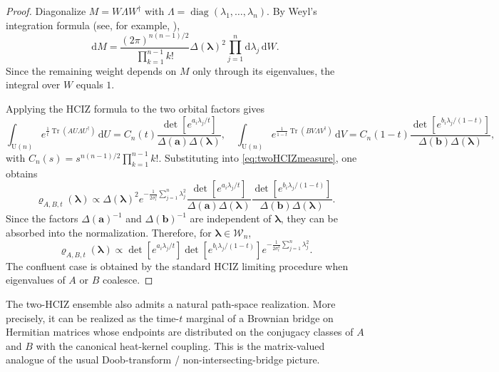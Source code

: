 \documentclass[11pt,a4paper]{article}
\theoremstyle{definition}\newtheorem{definition}[theorem]{Definition}
\theoremstyle{remark}\newtheorem{remark}[theorem]{Remark}
\numberwithin{equation}{section}
\DeclareMathOperator{\Tr}{Tr}
\DeclareMathOperator{\diag}{diag}
\newcommand{\dd}{\mathrm{d}}
\newcommand{\UU}{\mathrm{U}(n)}
\begin{document}
\begin{proof}
Diagonalize $M=W\Lambda W^\dagger$ with $\Lambda=\diag(\lambda_1,\dots,\lambda_n)$.  
By Weyl's integration formula (see, for example, \cite{Mehta2004}),
\begin{equation}
\dd M = \frac{(2\pi)^{n(n-1)/2}}{\prod_{k=1}^{n-1} k!} \Delta(\bm\lambda)^2 \prod_{j=1}^n \dd \lambda_j\,\dd W .
\end{equation}
Since the remaining weight depends on $M$ only through its eigenvalues, the integral over $W$ equals $1$.

Applying the HCIZ formula to the two orbital factors gives
\begin{equation*}
\int_{\UU} e^{\frac1t \Tr(AU\Lambda U^\dagger)}\,\dd U
= C_n(t)  \frac{\det[e^{a_i\lambda_j/t}]}{\Delta(\bm a)\Delta(\bm\lambda)},
\quad
\int_{\UU} e^{\frac1{1-t} \Tr(BV\Lambda V^\dagger)}\,\dd V
= C_n(1-t) \frac{\det[e^{b_i\lambda_j/(1-t)}]}{\Delta(\bm b)\Delta(\bm\lambda)},
\end{equation*}
with $C_n(s)=s^{n(n-1)/2}\prod_{k=1}^{n-1}k!$.  Substituting into \eqref{eq:twoHCIZmeasure}, one obtains
\begin{equation}
\varrho_{A,B,t}(\bm\lambda)
\propto
\Delta(\bm\lambda)^2
e^{-\frac1{2\sigma_t^2}\sum_{j=1}^n \lambda_j^2}
\frac{\det[e^{a_i\lambda_j/t}]}{\Delta(\bm a)\Delta(\bm\lambda)}
\frac{\det[e^{b_i\lambda_j/(1-t)}]}{\Delta(\bm b)\Delta(\bm\lambda)}.
\end{equation}
Since the factors $\Delta(\bm a)^{-1}$ and $\Delta(\bm b)^{-1}$ are independent of $\bm\lambda$, they can be    absorbed into the normalization. Therefore, for $\bm\lambda\in\mathcal W_n$,
\begin{equation}
\varrho_{A,B,t}(\bm\lambda)
\propto
\det[e^{a_i\lambda_j/t}]
\det[e^{b_i\lambda_j/(1-t)}]
e^{-\frac1{2\sigma_t^2}\sum_{j=1}^n \lambda_j^2}.
\end{equation}
 The confluent case is obtained by the standard HCIZ limiting procedure when eigenvalues of $A$ or $B$ coalesce.
\end{proof}

 



 

The two-HCIZ ensemble also admits a natural path-space realization. More precisely, it can be realized as the time-$t$ marginal of a Brownian bridge on Hermitian matrices whose endpoints are distributed on the conjugacy classes of $A$ and $B$ with the canonical heat-kernel coupling. This is the matrix-valued analogue of the usual Doob-transform / non-intersecting-bridge picture.
\end{document}
